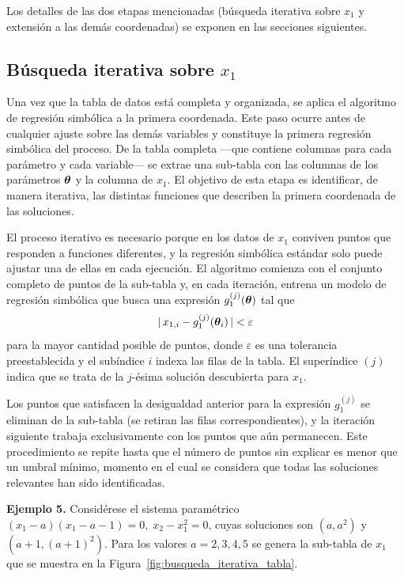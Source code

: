 Los detalles de las dos etapas mencionadas (búsqueda iterativa sobre
\(x_1\) y extensión a las demás coordenadas) se exponen en las
secciones siguientes.

\subsection{Búsqueda iterativa sobre \(x_1\)}
\label{sec:busqueda_ancla}

Una vez que la tabla de datos está completa y organizada, se aplica el algoritmo de regresión simbólica a la primera coordenada. Este paso ocurre antes de cualquier ajuste sobre las demás variables y constituye la primera regresión simbólica del proceso. De la tabla completa —que contiene columnas para cada parámetro y cada variable— se extrae una sub-tabla con las columnas de los parámetros
\(\boldsymbol{\theta}\) y la columna de \(x_1\). El objetivo de esta etapa es
identificar, de manera iterativa, las distintas funciones que describen la primera coordenada de las soluciones.

El proceso iterativo es necesario porque en los datos de \(x_1\) conviven puntos que responden a funciones diferentes, y la regresión simbólica estándar solo puede ajustar una de ellas en cada ejecución. El algoritmo comienza con el conjunto completo de puntos de la sub-tabla y, en cada iteración, entrena un modelo de regresión simbólica que busca una expresión \(g_1^{(j)}(\boldsymbol{\theta})\) tal que
\[
|\,x_{1,i} - g_1^{(j)}(\boldsymbol{\theta}_i)\,| < \varepsilon
\]
para la mayor cantidad posible de puntos, donde \(\varepsilon\) es una tolerancia preestablecida y el subíndice \(i\) indexa las filas de la tabla. El superíndice \((j)\) indica que se trata de la \(j\)-ésima solución descubierta para \(x_1\).

Los puntos que satisfacen la desigualdad anterior para la expresión
\(g_1^{(j)}\) se eliminan de la sub-tabla (se retiran las filas
correspondientes), y la iteración siguiente trabaja exclusivamente con los puntos que aún permanecen. Este procedimiento se repite hasta que el número de puntos sin explicar es menor que un umbral mínimo, momento en el cual se considera que todas las soluciones relevantes han sido identificadas.

\bigskip \noindent\textbf{Ejemplo 5.} Considérese el sistema paramétrico
\((x_1 - a)(x_1 - a - 1) = 0,\; x_2 - x_1^2 = 0\), cuyas soluciones
son \((a, a^2)\) y \((a+1, (a+1)^2)\). Para los valores
\(a = 2, 3, 4, 5\) se genera la sub-tabla de \(x_1\) que se muestra
en la Figura~\ref{fig:busqueda_iterativa_tabla}.

